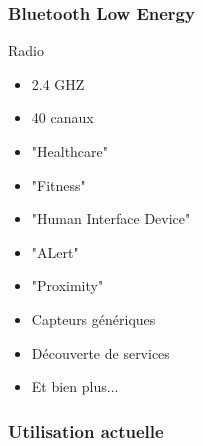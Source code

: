 \begin{frame}
	\frametitle{Bluetooth Low Energy}
	\begin{minipage}[t]{0.30\linewidth}
		\vspace{0.5cm}
		\begin{block}{Radio}
			\begin{itemize}
				\item 2.4 GHZ
				\item 40 canaux
			\end{itemize}
		\end{block}
	\end{minipage}
	\begin{minipage}[t]{0.66\linewidth}
		\vspace{0.5cm}
		\vspace{0.5cm}
		\begin{itemize}
			\item "Healthcare"
			\item "Fitness"
			\item "Human Interface Device"
			\item "ALert"
			\item "Proximity"
			\item Capteurs génériques
			\item Découverte de services
			\item Et bien plus...
		\end{itemize}
	\end{minipage}

\end{frame}

\begin{frame}
	\frametitle{Utilisation actuelle}
\end{frame}


